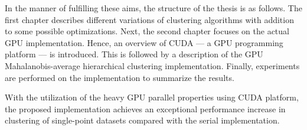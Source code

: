 In the manner of fulfilling these aims, the structure of the thesis is as follows. The first chapter describes different variations of clustering algorithms with addition to some possible optimizations. Next, the second chapter focuses on the actual GPU implementation. Hence, an overview of CUDA --- a GPU programming platform --- is introduced. This is followed by a description of the GPU Mahalanobis-average hierarchical clustering implementation. Finally, experiments are performed on the implementation to summarize the results.

With the utilization of the heavy GPU parallel properties using CUDA platform, the proposed implementation achieves an exceptional performance increase in clustering of single-point datasets compared with the serial implementation.